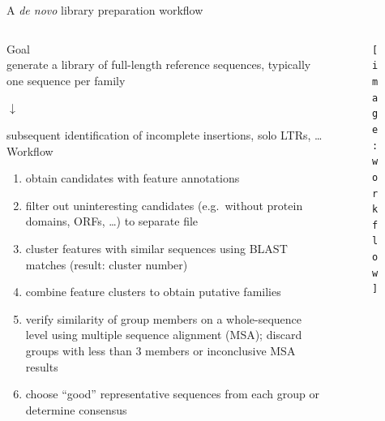 \documentclass[final]{beamer}
\begin{document}
\begin{frame}[fragile]
\begin{columns}[t]
\begin{column}{.45\linewidth}
        \begin{block}{A \emph{de novo} library preparation workflow}
          \begin{columns}
            \begin{column}{.5\linewidth}
              \alert{Goal}\\
              generate a library of full-length reference sequences, typically
              one sequence per family\\
              \centerline{$\downarrow$}
              subsequent identification of incomplete insertions,
              solo LTRs, \dots\\[.5cm]
              \alert{Workflow}\\
              \begin{enumerate}
                \item obtain candidates with feature annotations
                \item filter out uninteresting candidates (e.g.\ without
                      protein domains, ORFs, \dots ) to separate file
                \item cluster features with similar sequences
                      using BLAST matches (result: cluster number)
                \item combine feature clusters to obtain putative families
                \item verify similarity of group members on a whole-sequence
                      level using multiple sequence alignment (MSA); discard
                      groups with less than 3 members or inconclusive MSA
                      results
                \item choose ``good'' representative sequences from each group
                      or determine consensus
              \end{enumerate}
              \end{column}
            \begin{column}{.4\linewidth}
              \begin{figure}
                \centerline{\texttt{[image: workflow]}}
              \end{figure}
            \end{column}
          \end{columns}
        \end{block}


      \end{column}

      \begin{column}{.45\linewidth}


\end{column}
\end{columns}
\end{frame}
\end{document}
